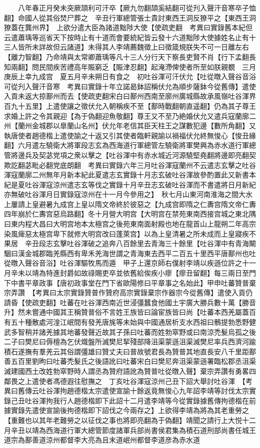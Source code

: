 　　八年春正月癸未突厥頡利可汗卒【厥九勿翻頡奚結翻可從刋入聲汗音寒卒子恤翻】命國人從其俗焚尸葬之　辛丑行軍總管張士貴討東西王洞反獠平之【東西王洞獠蓋在龔州界】　上欲分遣大臣為諸道黜陟大使【使疏吏翻　考異曰實錄舊本紀但云遣蕭瑀等巡省天下按時止有十道而會要統紀皆云發十六道黜陟大使據姓名止有十三人皆所未詳故但云諸道】未得其人李靖薦魏徵上曰徵箴規朕失不可一日離左右【離力智翻】乃命靖與太常卿蕭瑀等凡十三人分行天下察長吏賢不肖【行下孟翻長知兩翻】問民間疾苦禮高年賑窮乏【賑津忍翻】起淹滯俾使者所至如朕親覩　三月庚辰上幸九成宫　夏五月辛未朔日有食之　初吐谷渾可汗伏允【吐從暾入聲谷音浴可從刋入聲汗音寒　考異曰實錄十年立諾曷鉢詔稱伏允為順步薩鉢今從舊傳】遣使入貢未返大掠鄯州而去【使疏吏翻宋白曰鄯州西南至廓州廣城縣故承風嶺吐谷渾界百九十五里】上遣使讓之徵伏允入朝稱疾不至【鄯時戰翻朝直遥翻】仍為其子尊王求婚上許之令其親迎【為于偽翻迎魚敬翻】尊王又不至乃絶婚伏允又遣兵寇蘭廓二州【蘭州金城郡以臯蘭山名州】伏允年老信其臣天柱王之謀數犯邊【數所角翻】又執唐使者趙德楷上遣使諭之十返又引其使者臨軒親諭以禍福伏允終無悛心【悛丑緣翻】六月遣左驍衛大將軍段志玄為西海道行軍總管左驍衛將軍樊興為赤水道行軍總管將邊兵及契苾党項之衆以擊之【吐谷渾中有赤水城近河源驍堅堯翻將邊即亮翻契欺訖翻苾毗必翻党底朗翻　考異曰實錄六年三月吐谷渾寇蘭州不云遣志玄擊之吐谷渾寇蘭廓二州無年月新本紀此夏遣志玄實錄十月志玄破吐谷渾故參酌置此又新書本紀是夏吐谷渾寇涼州遣志玄等伐之實錄十月辛丑志玄破吐谷渾而不書遣將日月新紀亦無破吐谷渾月日實錄寇涼州在十一月今參用之】　秋七月山東河南淮海之間大水　上屢請上皇避暑九成宫上皇以隋文帝終於彼惡之【九成宫即隋之仁夀宫隋文帝仁夀四年崩於仁夀宫惡烏路翻】冬十月營大明宫【大明宫在禁苑東南西接宫城之東北隅曰東内程大昌曰大明宫地本太極宫之後苑東南面射殿也地在龍首山上龍朔二年高宗染風痺惡太極宫卑下就修大明宫改曰蓬萊宫】以為上皇清暑之所未成而上皇寢疾不果居　辛丑段志玄擊吐谷渾破之追奔八百餘里去青海三十餘里【吐谷渾中有青海闞駰曰漢金城郡臨羌縣西有卑禾羌海世謂之青海東去西平二百五十里西平唐鄯州也吐從暾入聲谷音浴】吐谷渾驅牧馬而遁　甲子上還京師右僕射李靖以疾遜位許之十一月辛未以靖為特進封爵如故祿賜吏卒並依舊給俟疾小瘳【瘳丑留翻】每三兩日至門下中書平章政事【唐初政事堂在門下省歐陽修曰平章事之名始此】甲申吐蕃贊普棄宗弄讚　【考異曰太宗實錄贊普作贊府高宗實錄棄宗作器宗今從舊傳】遣使入貢仍請昏【使疏吏翻】吐蕃在吐谷渾西南近世浸彊蠶食他國土宇廣大勝兵數十萬【勝音升】然未嘗通中國其王稱贊普俗不言姓王族皆曰論宦族皆曰尚【吐蕃本西羌屬蓋百有五十種散處河湟江岷間有發羌唐旄等未始與中國通居析支水西祖曰鶻提勃悉野健武多智稍并諸羌據其地蕃發聲近故其子孫曰吐蕃而姓勃窣野或曰南涼禿髮烏孤之後二子曰樊尼曰傉檀為乞伏熾盤所滅樊尼挈殘部降沮渠蒙遜沮渠滅樊尼率兵西濟河踰積石遂撫有羣羌云其俗謂彊雄曰贊丈夫曰普故號君長為贊普其地直長安八千里距鄯善五百里劉昫曰吐蕃禿髮氏之後語訛曰吐蕃宋白曰樊尼奔沮渠蒙遜署臨松郡丞沮渠滅建國西土改姓勃窣野時人謂丞為贊府語訛為贊普吐從暾入聲】棄宗弄讚有勇畧四鄰畏之上遣使者馮德遐往慰撫之　丁亥吐谷渾寇涼州己丑下詔大舉討吐谷渾　【考異曰舊傳云吐谷渾拘趙德楷太宗遣使宣諭十餘返竟無悛心九年詔李靖等討伐太宗實錄己丑吐谷渾拘我行人趙德楷即下此詔十二月遣李靖等今從實錄據舊傳拘德楷在前據實錄先遣使宣諭後拘德楷即下詔伐之今兩存之】上欲得李靖為將為其老重勞之【重難也以其年老難勞之以征伐之事也將即亮翻為于偽翻】靖聞之請行上大悦十二月辛丑以靖為西海道行軍大總管節度諸軍兵部尚書侯君集為積石道刑部尚書任城王道宗為鄯善道涼州都督李大亮為且末道岷州都督李道彦為赤水道